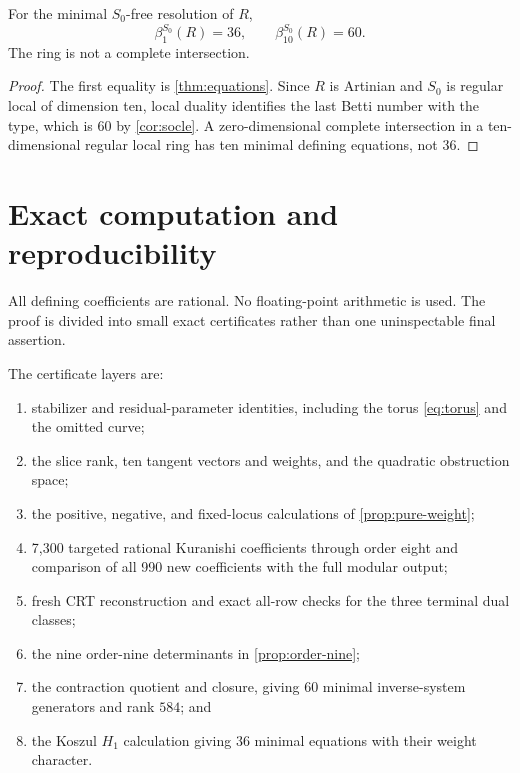\documentclass[11pt,reqno]{amsart}
\begin{document}
\begin{corollary}
\label{cor:betti}
For the minimal \(S_0\)-free resolution of \(R\),
\[
\beta_1^{S_0}(R)=36,\qquad
\beta_{10}^{S_0}(R)=60.
\]
The ring is not a complete intersection.
\end{corollary}

\begin{proof}
The first equality is \cref{thm:equations}.  Since \(R\) is Artinian and
\(S_0\) is regular local of dimension ten, local duality identifies the last
Betti number with the type, which is 60 by \cref{cor:socle}.  A
zero-dimensional complete intersection in a ten-dimensional regular local
ring has ten minimal defining equations, not 36.
\end{proof}

\section{Exact computation and reproducibility}
\label{sec:computation}

All defining coefficients are rational.  No floating-point arithmetic is
used.  The proof is divided into small exact certificates rather than one
uninspectable final assertion.

The certificate layers are:
\begin{enumerate}[label=(\arabic*)]
\item stabilizer and residual-parameter identities, including the torus
\eqref{eq:torus} and the omitted curve;
\item the slice rank, ten tangent vectors and weights, and the quadratic
obstruction space;
\item the positive, negative, and fixed-locus calculations of
\cref{prop:pure-weight};
\item 7,300 targeted rational Kuranishi coefficients through order eight and
comparison of all 990 new coefficients with the full modular output;
\item fresh CRT reconstruction and exact all-row checks for the three
terminal dual classes;
\item the nine order-nine determinants in \cref{prop:order-nine};
\item the contraction quotient and closure, giving 60 minimal
inverse-system generators and rank \(584\); and
\item the Koszul \(H_1\) calculation giving 36 minimal equations with their
weight character.
\end{enumerate}
\end{document}
